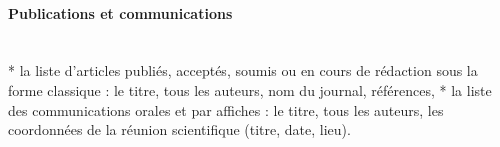 \paragraph{\textbf{Publications et communications}}\mbox{}\\
* la liste d’articles publiés, acceptés, soumis ou en cours de rédaction sous la forme classique : le titre, tous les auteurs, nom du journal, références,
* la liste des communications orales et par affiches : le titre, tous les auteurs, les coordonnées de la réunion scientifique (titre, date, lieu).